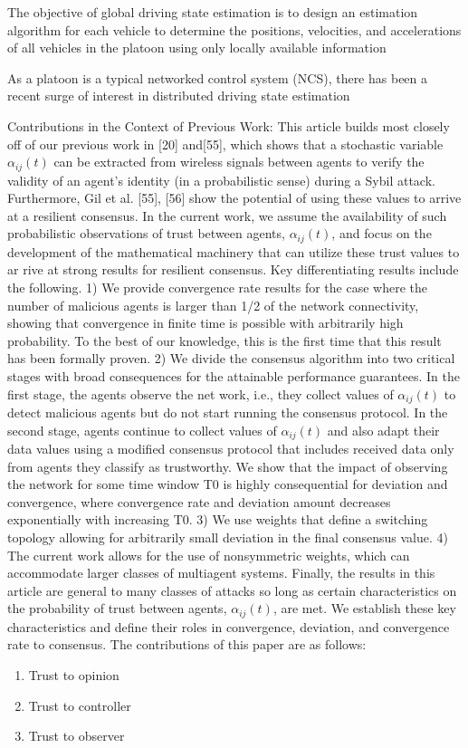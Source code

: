 \documentclass[letterpaper, 10pt, conference]{ieeeconf}  %
\begin{document}
 The objective of global driving state
 estimation is to design an estimation algorithm for each vehicle
 to determine the positions, velocities, and accelerations of all
 vehicles in the platoon using only locally available information

 As a platoon is a typical networked control system (NCS),
 there has been a recent surge of interest in distributed driving
 state estimation

    
Contributions in the Context of Previous Work: This article builds most closely off of our previous work in [20] and[55], which shows that a stochastic variable $\alpha_{ij}(t)$ can be extracted
 from wireless signals between agents to verify the validity of an
 agent's identity (in a probabilistic sense) during a Sybil attack.
 Furthermore, Gil et al. [55], [56] show the potential of using
 these values to arrive at a resilient consensus. In the current work,
 we assume the availability of such probabilistic observations of
 trust between agents, $\alpha_{ij}(t)$, and focus on the development of the
 mathematical machinery that can utilize these trust values to ar
rive at strong results for resilient consensus. Key differentiating
 results include the following.
 1) We provide convergence rate results for the case where
 the number of malicious agents is larger than 1/2 of the
 network connectivity, showing that convergence in finite
 time is possible with arbitrarily high probability. To the
 best of our knowledge, this is the first time that this result
 has been formally proven.
 2) We divide the consensus algorithm into two critical stages with broad consequences for the attainable performance guarantees. In the first stage, the agents observe the net
work, i.e., they collect values of $\alpha_{ij}(t)$ to detect malicious agents but do not start running the consensus protocol.
 In the second stage, agents continue to collect values of
 $\alpha_{ij}(t)$ and also adapt their data values using a modified consensus protocol that includes received data only from agents they classify as trustworthy. We show that the
 impact of observing the network for some time window T0 is highly consequential for deviation and convergence,
 where convergence rate and deviation amount decreases
 exponentially with increasing T0.
 3) We use weights that define a switching topology allowing for arbitrarily small deviation in the final consensus value.
 4) The current work allows for the use of nonsymmetric weights, which can accommodate larger classes of multiagent systems.
 Finally, the results in this article are general to many classes
 of attacks so long as certain characteristics on the probability
 of trust between agents, $\alpha_{ij}(t)$, are met. We establish these key
 characteristics and define their roles in convergence, deviation,
 and convergence rate to consensus.
The contributions of this paper are as follows:
\begin{enumerate}
\item Trust to opinion
\item Trust to controller
\item Trust to observer

\end{enumerate}
\end{document}
